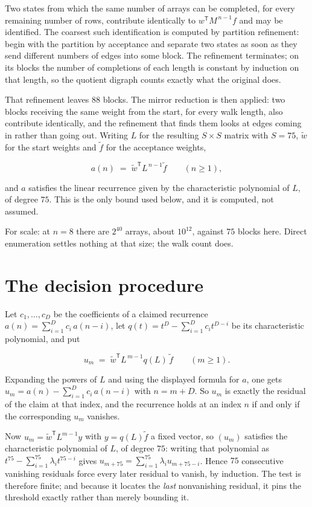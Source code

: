 \documentclass[11pt]{article}
\theoremstyle{definition}
\begin{document}
Two states from which the same number of arrays can be completed, for every remaining number of rows, contribute identically to $w^{\mathsf T}M^{\,n-1}f$ and may be identified. The coarsest such identification is computed by partition refinement: begin with the partition by acceptance and separate two states as soon as they send different numbers of edges into some block. The refinement terminates; on its blocks the number of completions of each length is constant by induction on that length, so the quotient digraph counts exactly what the original does.

That refinement leaves $88$ blocks. The mirror reduction is then applied: two blocks receiving the same weight from the start, for every walk length, also contribute identically, and the refinement that finds them looks at edges coming in rather than going out. Writing $L$ for the resulting $S \times S$ matrix with $S = 75$, $\tilde w$ for the start weights and $\tilde f$ for the acceptance weights,

\[a(n) \;=\; \tilde w^{\mathsf T} L^{\,n-1} \tilde f \qquad (n \ge 1),\]

and $a$ satisfies the linear recurrence given by the characteristic polynomial of $L$, of degree $75$. This is the only bound used below, and it is computed, not assumed.

For scale: at $n = 8$ there are $2^{40}$ arrays, about $10^{12}$, against $75$ blocks here. Direct enumeration settles nothing at that size; the walk count does.

\section{The decision procedure}

Let $c_1,\dots,c_D$ be the coefficients of a claimed recurrence $a(n) = \sum_{i=1}^{D} c_i\,a(n-i)$, let $q(t) = t^{D} - \sum_{i=1}^{D} c_i t^{D-i}$ be its characteristic polynomial, and put

\[u_m \;=\; \tilde w^{\mathsf T} L^{\,m-1} q(L)\,\tilde f \qquad (m \ge 1).\]

Expanding the powers of $L$ and using the displayed formula for $a$, one gets $u_m = a(n) - \sum_{i=1}^{D} c_i\,a(n-i)$ with $n = m + D$. So $u_m$ is exactly the residual of the claim at that index, and the recurrence holds at an index $n$ if and only if the corresponding $u_m$ vanishes.

Now $u_m = \tilde w^{\mathsf T} L^{m-1} y$ with $y = q(L)\tilde f$ a fixed vector, so $(u_m)$ satisfies the characteristic polynomial of $L$, of degree $75$: writing that polynomial as $t^{75} - \sum_{i=1}^{75} \lambda_i t^{75-i}$ gives $u_{m+75} = \sum_{i=1}^{75} \lambda_i u_{m+75-i}$. Hence $75$ consecutive vanishing residuals force every later residual to vanish, by induction. The test is therefore finite; and because it locates the {\itshape last} nonvanishing residual, it pins the threshold exactly rather than merely bounding it.
\end{document}
